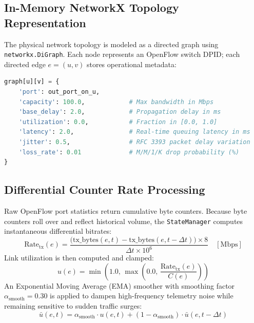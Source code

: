 \subsection{In-Memory NetworkX Topology Representation}
The physical network topology is modeled as a directed graph using \texttt{networkx.DiGraph}. Each node represents an OpenFlow switch DPID; each directed edge $e = (u, v)$ stores operational metadata:
\begin{lstlisting}[language=Python, caption={NetworkX Edge Telemetry Schema in StateManager}]
graph[u][v] = {
    'port': out_port_on_u,
    'capacity': 100.0,            # Max bandwidth in Mbps
    'base_delay': 2.0,            # Propagation delay in ms
    'utilization': 0.0,           # Fraction in [0.0, 1.0]
    'latency': 2.0,               # Real-time queuing latency in ms
    'jitter': 0.5,                # RFC 3393 packet delay variation
    'loss_rate': 0.01             # M/M/1/K drop probability (%)
}
\end{lstlisting}

\subsection{Differential Counter Rate Processing}
Raw OpenFlow port statistics return cumulative byte counters. Because byte counters roll over and reflect historical volume, the \texttt{StateManager} computes instantaneous differential bitrates:
\begin{equation}
    \text{Rate}_{\text{tx}}(e) = \frac{\big(\text{tx\_bytes}(e, t) - \text{tx\_bytes}(e, t - \Delta t)\big) \times 8}{\Delta t \times 10^6} \quad [\text{Mbps}]
\end{equation}
Link utilization is then computed and clamped:
\begin{equation}
    u(e) = \min\left(1.0, \, \max\left(0.0, \, \frac{\text{Rate}_{\text{tx}}(e)}{C(e)}\right)\right)
\end{equation}
An Exponential Moving Average (EMA) smoother with smoothing factor $\alpha_{\text{smooth}} = 0.30$ is applied to dampen high-frequency telemetry noise while remaining sensitive to sudden traffic surges:
\begin{equation}
    \bar{u}(e, t) = \alpha_{\text{smooth}} \cdot u(e, t) + (1 - \alpha_{\text{smooth}}) \cdot \bar{u}(e, t - \Delta t)
\end{equation}

